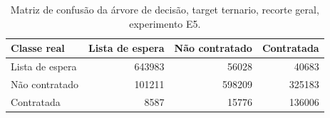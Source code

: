\begin{table}
\caption{Matriz de confusão da árvore de decisão, target ternario, recorte geral, experimento E5.}
\label{tab:matriz_confusao_treeClassification_19_profundidade_ternario_recorte_geral_in_sample_e5}
\begin{tabular}{lrrr}
\toprule
Classe real & Lista de espera & Não contratado & Contratada \\
\midrule
Lista de espera & 643983 & 56028 & 40683 \\
Não contratado & 101211 & 598209 & 325183 \\
Contratada & 8587 & 15776 & 136006 \\
\bottomrule
\end{tabular}
\end{table}
